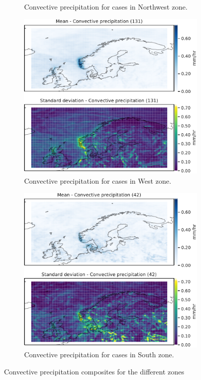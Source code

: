 \begin{figure}[H]
\begin{subfigure}[b]{0.49\textwidth}
    \caption{Convective precipitation for cases in Northwest zone.}
    \label{fig:NordWestcP}
\end{subfigure}
\begin{subfigure}[b]{0.49\textwidth}
    \centering
    \includegraphics[width=\textwidth]{Figures/cPVest.pdf}
    \caption{Convective precipitation for cases in West zone.}
    \label{fig:WestcP}
\end{subfigure}
\begin{subfigure}[b]{0.49\textwidth}
    \centering
    \includegraphics[width=\textwidth]{Figures/cPSor.pdf}
    \caption{Convective precipitation for cases in South zone.}
    \label{fig:SouthcP}
\end{subfigure}
\caption{Convective precipitation composites for the different zones}
\label{fig:convectivezones}
\end{figure}

